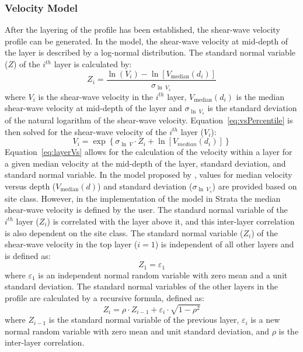 \documentclass[12pt,oneside]{book}
\begin{document}
\subsubsection{Velocity Model}

After the layering of the profile has been established, the shear-wave velocity profile can be
generated.  In the \citet{toro:95} model, the shear-wave velocity at mid-depth of the layer is
described by a log-normal distribution.  The standard normal variable ($Z$) of the $i^{th}$ layer is
calculated by:
\begin{equation}
    Z_i = \frac{\ln(V_i) - \ln[ V_\text{median}(d_i)]}{\sigma_{\ln\ V_s}}
    \label{eq:vsPercentile}
\end{equation}
where $V_i$ is the shear-wave velocity in the $i^{th}$ layer, $V_\text{median}(d_i)$ is the median
shear-wave velocity at mid-depth of the layer and $\sigma_{\ln\ V_s}$ is the standard deviation of the
natural logarithm of the shear-wave velocity.  Equation~\ref{eq:vsPercentile} is then solved for the
shear-wave velocity of the $i^{th}$ layer ($V_i$):
\begin{equation}
    V_i = \exp \left\{ \sigma_{\ln\ V} \cdot Z_i + \ln \left[ V_{median}(d_i) \right] \right\}
    \label{eq:layerVs}
\end{equation}
Equation~\ref{eq:layerVs} allows for the calculation of the velocity within a layer for a given
median velocity at the mid-depth of the layer, standard deviation, and standard normal variable.  In
the model proposed by \citet{toro:95}, values for median velocity versus depth ($V_\text{median}(d)$) and
standard deviation ($\sigma_{\ln\ V_s}$) are provided based on site class. However, in the
implementation of the \citet{toro:95} model in Strata the median shear-wave velocity is defined by
the user.  The standard normal variable of the $i^{th}$ layer ($Z_i$) is correlated with the layer
above it, and this inter-layer correlation is also dependent on the site class.  The standard normal
variable ($Z_i$) of the shear-wave velocity in the top layer ($i=1$) is independent of all other
layers and is defined as:
\begin{equation}
    Z_1 = \varepsilon_1
\end{equation}
where $\varepsilon_1$ is an independent normal random variable with zero mean and a unit standard
deviation.  The standard normal variables of the other layers in the profile are calculated by a
recursive formula, defined as:
\begin{equation}
    Z_i = \rho \cdot Z_{i-1} + \varepsilon_i \cdot \sqrt{1 - \rho^2} 
\end{equation}
where $Z_{i-1}$ is the standard normal variable of the previous layer, $\varepsilon_i$ is a new
normal random variable with zero mean and unit standard deviation, and $\rho$ is the inter-layer
correlation.  
\end{document}
